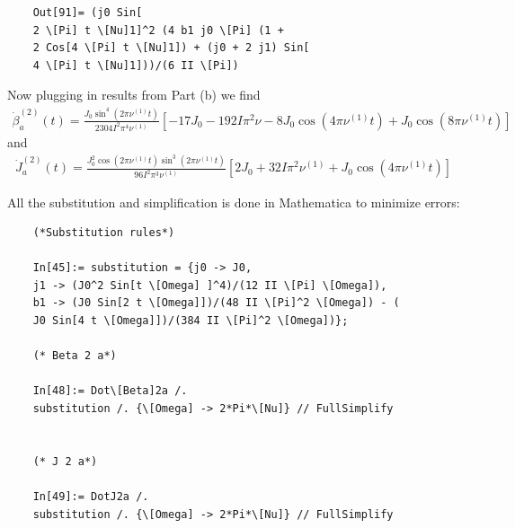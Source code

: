 \documentclass{article}
\theoremstyle{definition}
\newcommand{\be}{\beta}
\newcommand{\f}[2]{\frac{#1}{#2}}
\newcommand{\lb}{\left[}
\newcommand{\rb}{\right]}
\begin{document}
\begin{enumerate}[label=(\alph*)]
\begin{lstlisting}
	Out[91]= (j0 Sin[
	2 \[Pi] t \[Nu]1]^2 (4 b1 j0 \[Pi] (1 + 
	2 Cos[4 \[Pi] t \[Nu]1]) + (j0 + 2 j1) Sin[
	4 \[Pi] t \[Nu]1]))/(6 II \[Pi])
	\end{lstlisting}
	
	Now plugging in results from Part (b) we find 
	\begin{align*}
	\dot \be_a^{(2)}(t) = \f{J_0 \sin^4(2\pi \nu^{(1)} t)}{2304 I^2 \pi^4 \nu^{(1)}} \lb  -17 J_0 - 192 I \pi^2 \nu  - 8 J_0 \cos(4\pi \nu^{(1)}t ) + J_0  \cos(8\pi \nu^{(1)}t )\rb 
	\end{align*}
	and 
	\begin{align*}
	\dot J_a^{(2)}(t) = \f{J_0^2 \cos(2\pi \nu^{(1)}  t )  \sin^3(2\pi \nu^{(1)}  t )}{96 I^2 \pi^3 \nu^{(1)}} \lb 2J_0 + 32 I \pi^2 \nu^{(1)} + J_0 \cos(4\pi \nu^{(1)} t)   \rb
	\end{align*}
	
	All the substitution and simplification is done in Mathematica to minimize errors:
	\begin{lstlisting}
	(*Substitution rules*)
	
	In[45]:= substitution = {j0 -> J0, 
	j1 -> (J0^2 Sin[t \[Omega] ]^4)/(12 II \[Pi] \[Omega]), 
	b1 -> (J0 Sin[2 t \[Omega]])/(48 II \[Pi]^2 \[Omega]) - (
	J0 Sin[4 t \[Omega]])/(384 II \[Pi]^2 \[Omega])};
	
	(* Beta 2 a*)
	
	In[48]:= Dot\[Beta]2a /. 
	substitution /. {\[Omega] -> 2*Pi*\[Nu]} // FullSimplify
	
	
	(* J 2 a*)
	
	In[49]:= DotJ2a /. 
	substitution /. {\[Omega] -> 2*Pi*\[Nu]} // FullSimplify


	\end{lstlisting}
	
	
	

\end{enumerate}
\end{document}
